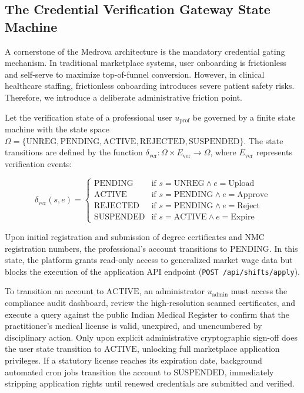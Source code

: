 \documentclass[conference]{IEEEtran}
\begin{document}
\subsection{The Credential Verification Gateway State Machine}
A cornerstone of the Medrova architecture is the mandatory credential gating mechanism. In traditional marketplace systems, user onboarding is frictionless and self-serve to maximize top-of-funnel conversion. However, in clinical healthcare staffing, frictionless onboarding introduces severe patient safety risks. Therefore, we introduce a deliberate administrative friction point.

Let the verification state of a professional user $u_{\text{prof}}$ be governed by a finite state machine with the state space $\Omega = \{\text{UNREG}, \text{PENDING}, \text{ACTIVE}, \text{REJECTED}, \text{SUSPENDED}\}$. The state transitions are defined by the function $\delta_{\text{ver}}: \Omega \times E_{\text{ver}} \rightarrow \Omega$, where $E_{\text{ver}}$ represents verification events:

\begin{equation}
\delta_{\text{ver}}(s, e) = 
\begin{cases} 
\text{PENDING} & \text{if } s = \text{UNREG} \land e = \text{Upload} \\
\text{ACTIVE} & \text{if } s = \text{PENDING} \land e = \text{Approve} \\
\text{REJECTED} & \text{if } s = \text{PENDING} \land e = \text{Reject} \\
\text{SUSPENDED} & \text{if } s = \text{ACTIVE} \land e = \text{Expire}
\end{cases}
\end{equation}

Upon initial registration and submission of degree certificates and NMC registration numbers, the professional's account transitions to $\text{PENDING}$. In this state, the platform grants read-only access to generalized market wage data but blocks the execution of the application API endpoint (\texttt{POST /api/shifts/apply}). 

To transition an account to $\text{ACTIVE}$, an administrator $u_{\text{admin}}$ must access the compliance audit dashboard, review the high-resolution scanned certificates, and execute a query against the public Indian Medical Register \cite{nmc2023register} to confirm that the practitioner's medical license is valid, unexpired, and unencumbered by disciplinary action. Only upon explicit administrative cryptographic sign-off does the user state transition to $\text{ACTIVE}$, unlocking full marketplace application privileges. If a statutory license reaches its expiration date, background automated cron jobs transition the account to $\text{SUSPENDED}$, immediately stripping application rights until renewed credentials are submitted and verified.
\end{document}
